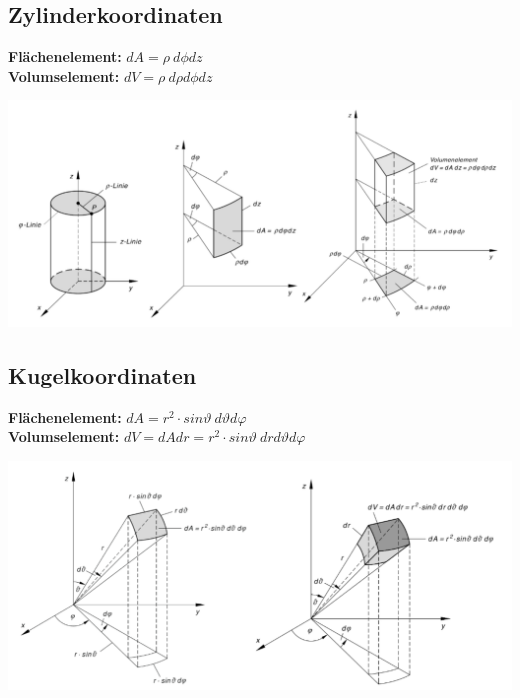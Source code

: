 \subsection{Zylinderkoordinaten}
\textbf{Flächenelement:} $dA=\rho\ d\phi dz$\\
\textbf{Volumselement:} $dV=\rho\ d\rho d\phi dz$

\includegraphics[width=\textwidth]{../pictures/Zylinderkoordinaten.png}

\subsection{Kugelkoordinaten}
\textbf{Flächenelement:} $dA=r^2 \cdot sin \vartheta \ d\vartheta d\varphi$\\
\textbf{Volumselement:} $dV= dAdr =r^2 \cdot sin \vartheta \ dr d\vartheta d\varphi$

\includegraphics[width=.8\textwidth]{../pictures/Kugelkoordinaten.png}